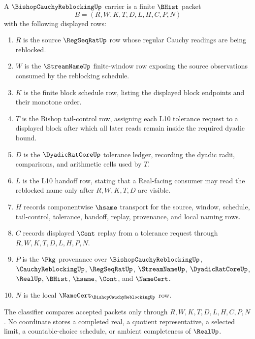 \begin{definition}
\label{def:bishop-cauchy-reblocking-carrier}
A $\BishopCauchyReblockingUp$ carrier is a finite $\BHist$ packet
$$
B=(R,W,K,T,D,L,H,C,P,N)
$$
with the following displayed rows:
\begin{enumerate}
\item $R$ is the source $\RegSeqRatUp$ row whose regular Cauchy readings are being reblocked.
\item $W$ is the $\StreamNameUp$ finite-window row exposing the source observations consumed by the reblocking schedule.
\item $K$ is the finite block schedule row, listing the displayed block endpoints and their monotone order.
\item $T$ is the Bishop tail-control row, assigning each L10 tolerance request to a displayed block after which all later reads remain inside the required dyadic bound.
\item $D$ is the $\DyadicRatCoreUp$ tolerance ledger, recording the dyadic radii, comparisons, and arithmetic cells used by $T$.
\item $L$ is the L10 handoff row, stating that a Real-facing consumer may read the reblocked name only after $R,W,K,T,D$ are visible.
\item $H$ records componentwise $\hsame$ transport for the source, window, schedule, tail-control, tolerance, handoff, replay, provenance, and local naming rows.
\item $C$ records displayed $\Cont$ replay from a tolerance request through $R,W,K,T,D,L,H,P,N$.
\item $P$ is the $\Pkg$ provenance over $\BishopCauchyReblockingUp$, $\CauchyReblockingUp$, $\RegSeqRatUp$, $\StreamNameUp$, $\DyadicRatCoreUp$, $\RealUp$, $\BHist$, $\hsame$, $\Cont$, and $\NameCert$.
\item $N$ is the local $\NameCert_{\BishopCauchyReblockingUp}$ row.
\end{enumerate}
The classifier compares accepted packets only through $R,W,K,T,D,L,H,C,P,N$. No coordinate stores a completed real, a quotient representative, a selected limit, a countable-choice schedule, or ambient completeness of $\RealUp$.
\end{definition}

